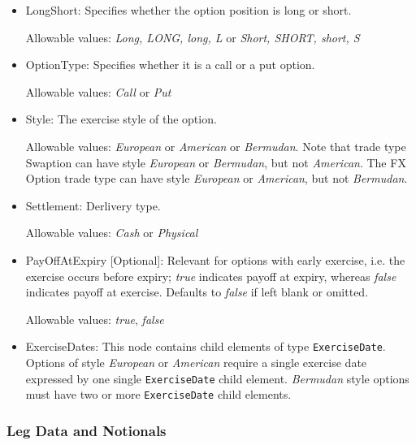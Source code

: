 \begin{itemize}
\item LongShort: Specifies whether the option position is long  or
  short.  

Allowable values: \emph{Long, LONG, long, L} or \emph{Short, SHORT,
  short, S}

\item OptionType: Specifies whether it is a call or a put option. 

Allowable values: \emph{Call} or \emph{Put} 

\item Style: The exercise style of the option. 

  Allowable values: \emph{European} or \emph{American} or \emph{Bermudan}. Note that trade type Swaption can have style
  \emph{European} or \emph{Bermudan}, but not \emph{American}. The FX Option trade type can have style \emph{European}
  or \emph{American}, but not \emph{Bermudan}.

\item Settlement: Derlivery type. 

Allowable values: \emph{Cash} or \emph{Physical} 

\item PayOffAtExpiry [Optional]: Relevant for options with early
  exercise, i.e. the exercise occurs before expiry; \emph{true}
  indicates payoff at expiry, whereas \emph{false}  indicates payoff
  at exercise. Defaults to \emph{false}  if left blank or omitted. 

Allowable values: \emph{true}, \emph{false}

\item ExerciseDates: This node contains child elements of type
  \lstinline!ExerciseDate!.  Options of style \emph{European} or
  \emph{American} require a single exercise date expressed by one
  single \lstinline!ExerciseDate! child element.  \emph{Bermudan}
  style options must have two or more \lstinline!ExerciseDate! child
  elements.

\end{itemize}



\subsubsection{Leg Data and Notionals}
\label{ss:leg_data}

